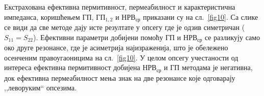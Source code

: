 Екстрахована ефективна пермитивност, пермеабилност и карактеристична импеданса, коришћењем $ГП$, $ГП_{1,2}$ и $НРВ_{ср}$ приказани су на сл.~\ref{fig10}. Са слике се види да све методе дају исте резултате у опсегу где је одзив симетричан ($S_{11} = S_{22}$). Ефективни параметри добијени помоћу ГП и $НРВ_{ср}$ се разликују само око друге резонансе, где је асиметрија најизраженија, што је обележено осенченим правоугаоницима на сл.~\ref{fig10}. У целом опсегу учестаности од интереса ефективна пермитивност добијена $НРВ_{ср}$ и ГП методама је негативна, док ефективна пермеабилност мења знак на две резонансе које одговарају ,,леворуким`` опсезима.
\begin{figure}[!t]
\centering
{}
\end{figure}
